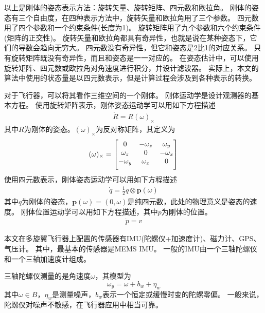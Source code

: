 \documentclass[
  type=master
]{gdutthesis}
\begin{document}
以上是刚体的姿态表示方法：旋转矢量、旋转矩阵、四元数和欧拉角。
刚体的姿态有三个自由度，在四种表示方法中，旋转矢量和欧拉角用了三个参数。
四元数用了四个参数和一个约束条件(长度为1)。
旋转矩阵用了九个参数和六个约束条件(矩阵的正交性)。
旋转矢量和欧拉角都具有奇异性，也就是说在某种姿态下，它们的导数会趋向无穷大。
四元数没有奇异性，但它和姿态是2比1的对应关系。
只有旋转矩阵既没有奇异性，而且和姿态是一一对应的。
在姿态估计中，可以使用旋转矩阵、四元数或欧拉角对角速度进行积分，并设计滤波器。
实际上，本文的算法中使用的状态量是以四元数表示，但是计算过程会涉及到各种表示的转换。

对于飞行器，可以将其看作三维空间的一个刚体。
刚体运动学是设计观测器的基本方程。
使用旋转矩阵表示，刚体姿态运动学可以用如下方程描述
\begin{gather}\label{eq:matrixkinematics}
	\dot{R}=R (\omega)_{\times}
\end{gather}
其中$R$为刚体的姿态。$(\omega)_{\times}$为反对称矩阵，其定义为
\begin{gather}\label{eq:matrixkinematics}
	(\omega)_{\times}=
	\begin{bmatrix}
		0 & -\omega_z & \omega_y\\
		\omega_z & 0 & -\omega_x\\
		-\omega_y & \omega_x & 0\vspace{1ex}
	\end{bmatrix}
\end{gather}
\vspace{1ex}使用四元数表示，刚体姿态运动学可以用如下方程描述
\begin{gather}\label{eq:quatkinematics}
	\dot{q}=\frac{1}{2} q \otimes \mathbf{p}(\omega)
\end{gather}
其中$q$为刚体的姿态，$\mathbf{p}(\omega)=(0,\omega)$是纯四元数，此处的物理意义是姿态的速度。
刚体位置运动学可以用如下方程描述，其中$p$为刚体的位置。
\begin{gather}\label{eq:matrixkinematics}
	\dot{p}=v
\end{gather}

本文在多旋翼飞行器上配置的传感器有IMU(陀螺仪+加速度计)、磁力计、GPS、气压计。
其中，最基本的传感器是MEMS IMU。
一般的IMU由一个三轴陀螺仪和一个三轴加速度计组成。

三轴陀螺仪测量的是角速度$\omega$，其模型为
\begin{equation}\label{eq:gyromodel}
	\omega_y=\omega+b_w+\eta_w
\end{equation}
其中$\omega \in B$，$\eta_w$是测量噪声，$b_w$表示一个恒定或缓慢时变的陀螺零偏。
一般来说，陀螺仪对噪声不敏感，在飞行器应用中相当可靠。
\end{document}
